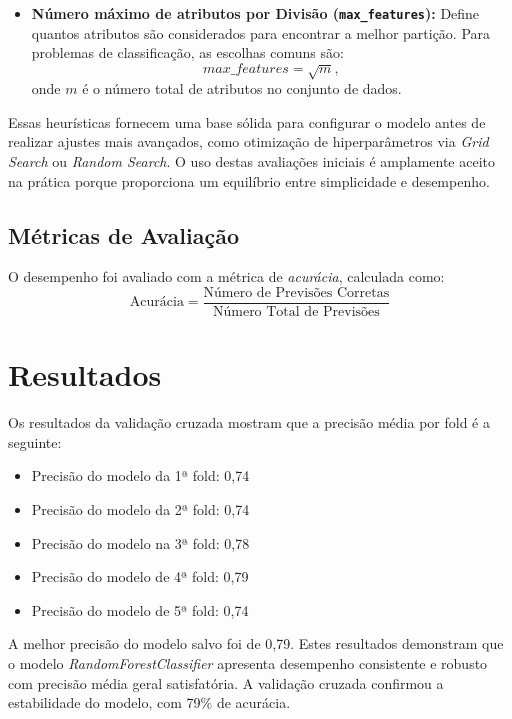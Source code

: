 \documentclass[a4paper,12pt]{article}
\begin{document}
\begin{itemize}
    \item \textbf{Número máximo de atributos por Divisão (\texttt{max\_features}):} Define quantos atributos são considerados para encontrar a melhor partição. Para problemas de classificação, as escolhas comuns são:
    \begin{equation}
    max\_features = \sqrt{m},
    \end{equation}
    onde \( m \) é o número total de atributos no conjunto de dados.
\end{itemize}

Essas heurísticas fornecem uma base sólida para configurar o modelo antes de realizar ajustes mais avançados, como otimização de hiperparâmetros via \textit{Grid Search} ou \textit{Random Search}. O uso destas avaliações iniciais é amplamente aceito na prática porque proporciona um equilíbrio entre simplicidade e desempenho.

\subsection{Métricas de Avaliação}
O desempenho foi avaliado com a métrica de \textit{acurácia}, calculada como:
\[
\text{Acurácia} = \frac{\text{Número de Previsões Corretas}}{\text{Número Total de Previsões}}
\]

\section{Resultados}
\singlespacing

Os resultados da validação cruzada mostram que a precisão média por fold é a seguinte:

\begin{itemize}
    \item Precisão do modelo da 1ª fold: 0,74
    \item Precisão do modelo da 2ª fold: 0,74
    \item Precisão do modelo na 3ª fold: 0,78
    \item Precisão do modelo de 4ª fold: 0,79
    \item Precisão do modelo de 5ª fold: 0,74
\end{itemize}

A melhor precisão do modelo salvo foi de 0,79.
Estes resultados demonstram que o modelo \textit{RandomForestClassifier} apresenta desempenho consistente e robusto com precisão média geral satisfatória. A validação cruzada confirmou a estabilidade do modelo, com 79\% de acurácia.
\end{document}
